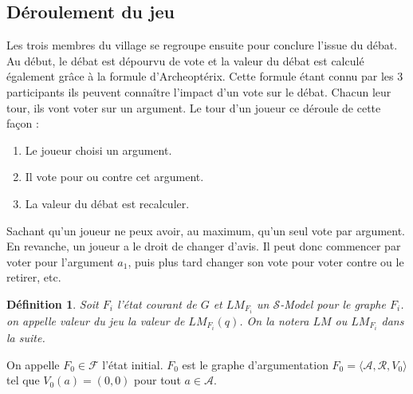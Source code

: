 \documentclass[11pt]{article}
\theoremstyle{defi}
\newtheorem{definition}{Définition}[section]
\theoremstyle{not}
\theoremstyle{prob}
\begin{document}
    \subsection{Déroulement du jeu}
      Les trois membres du village se regroupe ensuite pour conclure l'issue du débat.
      Au début, le débat est dépourvu de vote et la valeur du débat est calculé également grâce à la formule d'Archeoptérix.
      Cette formule étant connu par les 3 participants ils peuvent connaître l'impact d'un vote sur le débat.
      Chacun leur tour, ils vont voter sur un argument. Le tour d'un joueur ce déroule de cette façon :
      \begin{enumerate}
        \item Le joueur choisi un argument.
        \item Il vote pour ou contre cet argument.
        \item La valeur du débat est recalculer.
      \end{enumerate}


      Sachant qu'un joueur ne peux avoir, au maximum, qu'un seul vote par argument.
      En revanche, un joueur a le droit de changer d'avis.
      Il peut donc commencer par voter pour l'argument $a_1$, puis plus tard changer son vote pour voter contre ou le retirer, etc.

      \begin{definition}
        Soit $F_i$ l'état courant de $G$ et $LM_{F_i}$ un $\mathcal{S}$-Model pour le graphe $F_i$.
        on appelle valeur du jeu la valeur de $LM_{F_i}(q)$. On la notera $LM$ ou $LM_{F_i}$ dans la suite.
      \end{definition}

      On appelle $F_0 \in \mathcal{F}$ l'état initial.
      $F_0$ est le graphe d'argumentation $F_0 = \langle \mathcal{A}, \mathcal{R}, V_0 \rangle$ tel que $V_0(a) = (0, 0)$ pour tout $a \in \mathcal{A}$.\\
\end{document}
